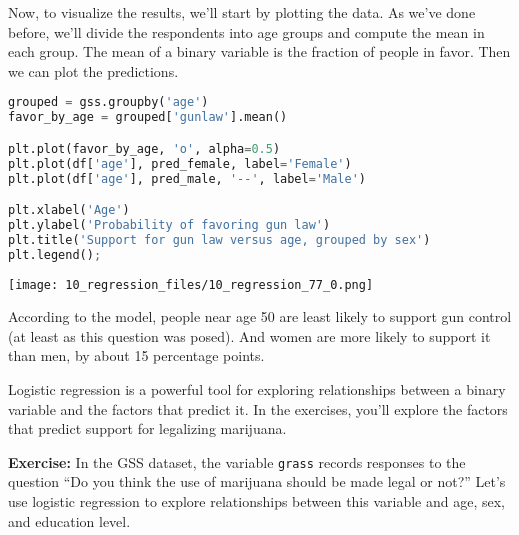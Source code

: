 Now, to visualize the results, we'll start by plotting the data. As
we've done before, we'll divide the respondents into age groups and
compute the mean in each group. The mean of a binary variable is the
fraction of people in favor. Then we can plot the predictions.

\begin{lstlisting}[language=Python,style=source]
grouped = gss.groupby('age')
favor_by_age = grouped['gunlaw'].mean()

plt.plot(favor_by_age, 'o', alpha=0.5)
plt.plot(df['age'], pred_female, label='Female')
plt.plot(df['age'], pred_male, '--', label='Male')

plt.xlabel('Age')
plt.ylabel('Probability of favoring gun law')
plt.title('Support for gun law versus age, grouped by sex')
plt.legend();
\end{lstlisting}

\begin{center}
\texttt{[image: 10\_regression\_files/10\_regression\_77\_0.png]}
\end{center}

According to the model, people near age 50 are least likely to support
gun control (at least as this question was posed). And women are more
likely to support it than men, by about 15 percentage points.

Logistic regression is a powerful tool for exploring relationships
between a binary variable and the factors that predict it. In the
exercises, you'll explore the factors that predict support for
legalizing marijuana.

\textbf{Exercise:} In the GSS dataset, the variable
\passthrough{\lstinline!grass!} records responses to the question ``Do
you think the use of marijuana should be made legal or not?'' Let's use
logistic regression to explore relationships between this variable and
age, sex, and education level.

